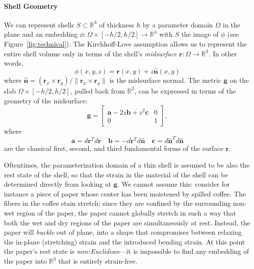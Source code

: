 \documentclass[timestamp,acmtog]{acmart}
\newcommand{\ba}{\mathbf{a}}
\newcommand{\bb}{\mathbf{b}}
\newcommand{\bc}{\mathbf{c}}
\newcommand{\bg}{\mathbf{g}}
\newcommand{\br}{\mathbf{r}}
\newcommand{\hn}{\hat{\mathbf{n}}}
\begin{document}
\paragraph{Shell Geometry} We can represent shells $S\subset \mathbb{R}^3$ of thickness $h$ by a parameter domain $\Omega$ in the plane and an embedding $\phi\colon \Omega\times [-h/2, h/2]\to\mathbb{R}^3$ with $S$ the image of $\phi$ (see Figure~\ref{fig:technical}). The Kirchhoff-Love assumption allows us to represent the entire shell volume only in terms of the shell's \emph{midsurface} $\br\colon\Omega\to\mathbb{R}^3$. In other words,
$$\phi(x,y,z) = \br(x,y) + z\hn(x,y)$$
where $\hn = (\br_x \times \br_y)/\|\br_x \times \br_y\|$ is the midsurface normal. The metric $\bg$ on the slab $\Omega \times [-h/2,h/2]$, pulled back from $\mathbb{R}^3$, can be expressed in terms of the geometry of the midsurface:
\begin{equation}
\bg = \left[\begin{array}{cc}\ba - 2z\bb + z^2 \bc & 0\\0 & 1\end{array}\right],\label{eq:offset}
\end{equation}
where
$$\ba = d\br^Td\br \quad \bb = -d\br^Td\hn \quad \bc = d\hn^Td\hn$$
are the classical first, second, and third fundamental forms of the surface $\br$.

Oftentimes, the parameterization domain of a thin shell is assumed to be also the rest state of the shell, so that the strain in the material of the shell can be determined directly from looking at $\bg$. We cannot assume this: consider for instance a piece of paper whose center has been moistened by spilled coffee. The fibers in the coffee stain stretch; since they are confined by the surrounding non-wet region of the paper, the paper cannot globally stretch in such a way that both the wet and dry regions of the paper are simultaneously at rest. Instead, the paper will \emph{buckle} out of plane, into a shape that compromises between relaxing the in-plane (stretching) strain and the introduced bending strain. At this point the paper's rest state is \emph{non-Euclidean}---it is impossible to find any embedding of the paper into $\mathbb{R}^3$ that is entirely strain-free.
\end{document}
